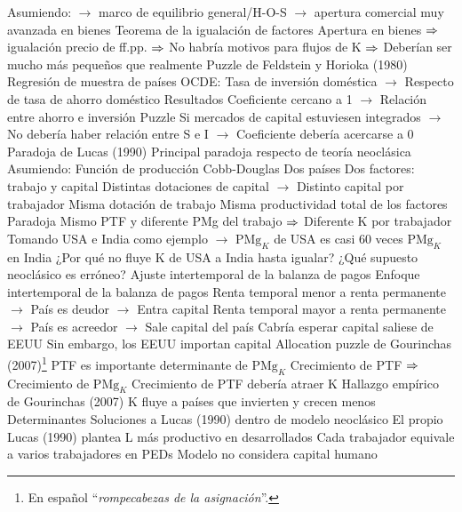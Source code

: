 \documentclass{nuevotema}
\begin{document}
\begin{esquemal}
				\4 Asumiendo:
				\4[] $\to$ marco de equilibrio general/H-O-S
				\4[] $\to$ apertura comercial muy avanzada en bienes
				\4 Teorema de la igualación de factores
				\4[] Apertura en bienes $\then$ igualación precio de ff.pp.
				\4[] $\then$ No habría motivos para flujos de K
				\4[] $\then$ Deberían ser mucho más pequeños que realmente
			\3 Puzzle de Feldstein y Horioka (1980)
				\4 Regresión de muestra de países OCDE:
				\4[] Tasa de inversión doméstica
				\4[] $\to$ Respecto de tasa de ahorro doméstico
				\4 Resultados
				\4[] Coeficiente cercano a 1
				\4[] $\to$ Relación entre ahorro e inversión
				\4 Puzzle
				\4[] Si mercados de capital estuviesen integrados
				\4[] $\to$ No debería haber relación entre S e I
				\4[] $\to$ Coeficiente debería acercarse a 0
			\3 Paradoja de Lucas (1990)
				\4 Principal paradoja respecto de teoría neoclásica
				\4 Asumiendo:
				\4[] Función de producción Cobb-Douglas
				\4[] Dos países
				\4[] Dos factores: trabajo y capital
				\4[] Distintas dotaciones de capital
				\4[] $\to$ Distinto capital por trabajador
				\4[] Misma dotación de trabajo
				\4[] Misma productividad total de los factores
				\4 Paradoja
				\4[] Mismo PTF y diferente PMg del trabajo
				\4[] $\then$ Diferente K por trabajador
				\4[] Tomando USA e India como ejemplo
				\4[] $\to$ $\text{PMg}_K$ de USA es casi 60 veces $\text{PMg}_K$ en India
				\4[$\to$] ¿Por qué no fluye K de USA a India hasta igualar?
				\4[$\to$] ¿Qué supuesto neoclásico es erróneo?
			\3 Ajuste intertemporal de la balanza de pagos
				\4 Enfoque intertemporal de la balanza de pagos
				\4[] Renta temporal menor a renta permanente
				\4[] $\to$ País es deudor
				\4[] $\to$ Entra capital
				\4[] Renta temporal mayor a renta permanente
				\4[] $\to$ País es acreedor
				\4[] $\to$ Sale capital del país
				\4[$\then$] Cabría esperar capital saliese de EEUU
				\4[] Sin embargo, los EEUU importan capital
			\3 Allocation puzzle de Gourinchas (2007)\footnote{En español ``\textit{rompecabezas de la asignación}''.}
				\4 PTF es importante determinante de $\text{PMg}_K$
				\4[] Crecimiento de PTF
				\4[] $\then$ Crecimiento de $\text{PMg}_K$
				\4[$\then$] Crecimiento de PTF debería atraer K
				\4 Hallazgo empírico de Gourinchas (2007)
				\4[] K fluye a países que invierten y crecen menos
		\2 Determinantes
			\3 Soluciones a Lucas (1990) dentro de modelo neoclásico
				\4 El propio Lucas (1990) plantea
				\4[i] L más productivo en desarrollados
				\4[] Cada trabajador equivale a varios trabajadores en PEDs
				\4[ii] Modelo no considera capital humano

\end{esquemal}
\end{document}
